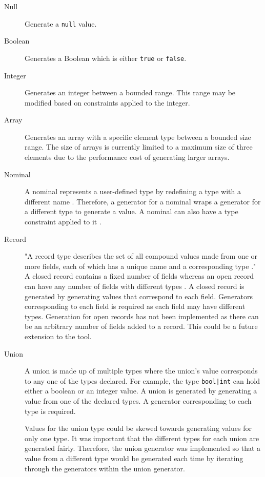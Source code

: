 \begin{description}
	\item[Null] Generate a \texttt{null} value.
	\item[Boolean] Generates a Boolean which is either \texttt{true} or \texttt{false}.
	\item[Integer] Generates an integer between a bounded range. This range may be modified based on constraints applied to the integer.
	\item[Array] Generates an array with a specific element type between a bounded size range.
	The size of arrays is currently limited to a maximum size of three elements due to the performance cost of generating larger arrays.
	\item[Nominal] A nominal represents a user-defined type by redefining a type with a different name \cite{WhileyLang}.
	Therefore, a generator for a nominal wraps a generator for a different type to generate a value. 
	A nominal can also have a type constraint applied to it \cite{WhileyLang}.
	\item[Record] "A record type describes the set of all compound values made from one or more fields, each of which has a unique name and a corresponding type \cite{WhileyLang}."
	A closed record contains a fixed number of fields whereas an open record can have any number of fields with different types \cite{WhileyLang}.
	A closed record is generated by generating values that correspond to each field. Generators corresponding to each field is required as each field may have different types. 
	Generation for open records has not been implemented as there can be an arbitrary number of fields added to a record. 
	This could be a future extension to the tool.
	\item[Union] A union is made up of multiple types where the union's value corresponds to any one of the types declared. For example, the type \texttt{bool|int} can hold either a boolean or an integer value. 
	A union is generated by generating a value from one of the declared types. A generator corresponding to each type is required. 

	Values for the union type could be skewed towards generating values for only one type. It was important that the different types for each union are generated fairly. Therefore, the union generator was implemented so that a value from a different type would be generated each time by iterating through the generators within the union generator.

\end{description}

